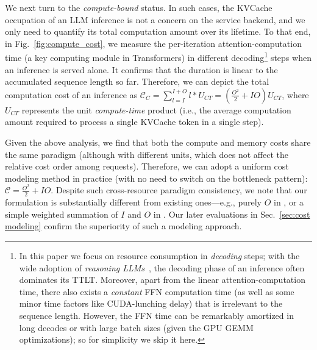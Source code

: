 We next turn to the \emph{compute-bound} status. 
In such cases, the KVCache occupation of an LLM inference is not a concern on the service backend, and we only need to quantify its total computation amount over its lifetime.
To that end, in Fig.~\ref{fig:compute_cost}, we measure the per-iteration attention-computation time (a key computing module in Transformers) in different decoding\footnote{
In this paper we focus on resource consumption in \emph{decoding} steps; with the wide adoption of \emph{reasoning LLMs}~\cite{cai2025r}, the decoding phase of an inference often dominates its TTLT.
Moreover, apart from the linear attention-computation time, there also exists a \emph{constant} FFN computation time (as well as some minor time factors like CUDA-lunching delay) that is irrelevant to the sequence length. 
However, the FFN time can be remarkably amortized in long decodes or with large batch sizes (given the GPU GEMM optimizations); so for simplicity we skip it here.  
} steps when an inference is served alone. %
It confirms that the duration is linear to the accumulated sequence length so far.
{Therefore, we can depict the total computation cost of an inference as $\mathcal{C}_C=\sum_{l=I}^{I+O}l*U_{CT}=(\frac{O^2}{2}+IO)U_{CT}$, where $U_{CT}$ represents the unit \emph{compute-time} product} (i.e., the average computation amount required to process a single KVCache token in a single step). 

Given the above analysis, we find that both the compute and memory costs share the same paradigm (although with different units, which does not affect the relative cost order among requests).
Therefore, we can adopt a uniform cost modeling method in practice (with no need to switch on the bottleneck pattern): $\mathcal{C}=\frac{O^2}{2}+IO$.
Despite such cross-resource paradigm consistency, we note that our formulation is substantially different from existing ones---e.g., purely $O$ in \cite{qiu2024efficient,fu2024efficient,shahout2024don}, or a simple weighted summation of $I$ and $O$ in \cite{sheng2024fairness}. 
Our later evaluations in {Sec.~\ref{sec:cost modeling}} confirm the superiority of such a modeling approach. 





